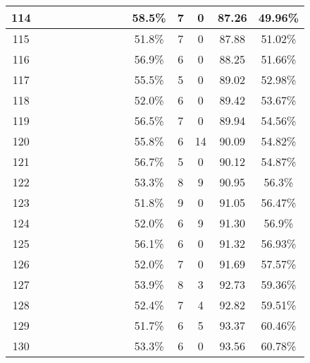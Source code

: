 \begin{longtable}{|c|c|c|c|c|c|c|c|c|c|c|c|c|c|}
114 &  \x    & \x    & \x    & \x    &       &       & \x\m  &       & 58.5\% &  7  & 0  & 87.26 & 49.96\% \\ \hline
115 &  \x    & \x    &       &       &       &       & \x    &       & 51.8\% &  7  & 0  & 87.88 & 51.02\% \\ \hline
116 &  \x    & \x    &       & \x    & \x    & \x    & \x    &       & 56.9\% &  6  & 0  & 88.25 & 51.66\% \\ \hline
117 &  \x    & \x    & \x    &       &       &       &       &       & 55.5\% &  5  & 0  & 89.02 & 52.98\% \\ \hline
118 &  \x    & \x    &       &       &       & \x    & \x    &       & 52.0\% &  6  & 0  & 89.42 & 53.67\% \\ \hline
119 &  \x    & \x    & \x    & \x    &       & \x\m  &       & \x    & 56.5\% &  7  & 0  & 89.94 & 54.56\% \\ \hline
120 &  \x    & \x    &       &       & \x    &       & \x    &       & 55.8\% &  6  & 14 & 90.09 & 54.82\% \\ \hline
121 &  \x    & \x    & \x    &       &       & \x\m  & \x\m  &       & 56.7\% &  5  & 0  & 90.12 & 54.87\% \\ \hline
122 &  \x    & \x    &       & \x    &       &       &       &       & 53.3\% &  8  & 9  & 90.95 & 56.3\% \\ \hline
123 &  \x    & \x    &       &       &       &       &       & \x\m  & 51.8\% &  9  & 0  & 91.05 & 56.47\% \\ \hline
124 &  \x    & \x    &       & \x    &       & \x\m  &       &       & 52.0\% &  6  & 9  & 91.30 & 56.9\% \\ \hline
125 &  \x    & \x    &       & \x    & \x    & \x    &       & \x    & 56.1\% &  6  & 0  & 91.32 & 56.93\% \\ \hline
126 &  \x    & \x    &       & \x    &       &       &       & \x    & 52.0\% &  7  & 0  & 91.69 & 57.57\% \\ \hline
127 &  \x    & \x    & \x    &       &       & \x\m  &       &       & 53.9\% &  8  & 3  & 92.73 & 59.36\% \\ \hline
128 &  \x    & \x    &       & \x    &       &       & \x    &       & 52.4\% &  7  & 4  & 92.82 & 59.51\% \\ \hline
129 &  \x    & \x    &       & \x    &       & \x    & \x    &       & 51.7\% &  6  & 5  & 93.37 & 60.46\% \\ \hline
130 &  \x    & \x    &       & \x    &       &       & \x\m  &       & 53.3\% &  6  & 0  & 93.56 & 60.78\% \\ \hline

\end{longtable}
